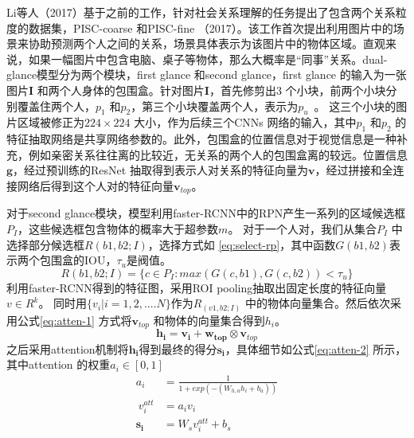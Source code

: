 Li等人（2017）\cite{li2017dual-glance}基于之前的工作，针对社会关系理解的任务提出了包含两个关系粒度的数据集，PISC-coarse 和PISC-fine （2017）\cite{li2017dual-glance}。该工作首次提出利用图片中的场景来协助预测两个人之间的关系，场景具体表示为该图片中的物体区域。直观来说，如果一幅图片中包含电脑、桌子等物体，那么大概率是``同事''关系。dual-glance模型分为两个模块，first glance 和second glance，first glance 的输入为一张图片$\mathbf{I}$ 和两个人身体的包围盒。针对图片$\mathbf{I}$，首先修剪出3 个小块，前两个小块分别覆盖住两个人，$p_1$ 和$p_2$，第三个小块覆盖两个人，表示为$p_{u}$~。 这三个小块的图片区域被修正为$224 \times 224$ 大小，作为后续三个CNNs 网络的输入，其中$p_1$ 和$p_2$ 的特征抽取网络是共享网络参数的。此外，包围盒的位置信息对于视觉信息是一种补充，例如亲密关系往往离的比较近，无关系的两个人的包围盒离的较远。位置信息$\mathbf{g}$，经过预训练的ResNet\cite{he2016deep} 抽取得到表示人对关系的特征向量为$\mathbf{v}$，经过拼接和全连接网络后得到这个人对的特征向量$\mathbf{v}_{top}$。

对于second glance模块，模型利用faster-RCNN\cite{ren2015faster}中的RPN产生一系列的区域候选框$P_{I}$，这些候选框包含物体的概率大于超参数$m$。 对于一个人对，我们从集合$P_{I}$ 中选择部分候选框$R(b1,b2;I)$，选择方式如
\ref{eq:select-rp}，其中函数$G(b1,b2)$表示两个包围盒的IOU，$\tau_{u}$是阀值。
\begin{equation}\label{eq:select-rp}
    R(b1,b2;I) = \{c \in P_{I} : max(G(c,b1),G(c,b2))<\tau_{u}\}
\end{equation}
利用faster-RCNN得到的特征图，采用ROI pooling抽取出固定长度的特征向量$v \in R^{k}$。 同时用$\{v_i|i=1, 2, .... N\}$作为$R_(v1,b2;I)$ 中的物体向量集合。然后依次采用公式\ref{eq:atten-1} 方式将$\mathbf{v}_{top}$ 和物体的向量集合得到$h_i$。
\begin{equation}\label{eq:atten-1}
    \mathbf{h_i} = \mathbf{v_i} + \mathbf{w_{top}} \otimes \mathbf{v}_{top}
\end{equation}
之后采用attention机制将$\mathbf{h_i}$得到最终的得分$\mathbf{s_i}$，具体细节如公式\ref{eq:atten-2} 所示，其中attention 的权重$a_{i} \in [0,1]$
\begin{equation} \label{eq:atten-2}
    \begin{split}
        a_{i} &= \frac{1}{1+exp(-(W_{h,a}h_{i}+b_{a}))} \\
        ~v^{att}_{i} &= a_{i}v_{i} \\
        \mathbf{s_i} &= W_{s} v_{i}^{att} + b_{s}
    \end{split}
\end{equation}

